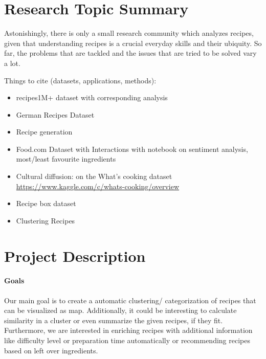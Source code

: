 \documentclass[
     12pt,         %
     a4paper,      %
     BCOR10mm,     %
     DIV14,        %
     ]{article}
\begin{document}

\section{Research Topic Summary}

Astonishingly, there is only a small research community which analyzes recipes, given that understanding recipes is a crucial everyday skills and their ubiquity. So far, the problems that are tackled and the issues that are tried to be solved vary a lot. 

Things to cite (datasets, applications, methods):
\begin{itemize}
  \item recipes1M+ dataset \cite{marin2019recipe1m} with corresponding analysis \cite{8099810}
  \item German Recipes Dataset \cite{germanrecipesdataset}
  \item Recipe generation \cite{majumder-etal-2019-generating}
  \item Food.com Dataset with Interactions \cite{foodcominteractions} with notebook on sentiment analysis, most/least favourite ingredients
  \item Cultural diffusion: \cite{cultdiffusion} on the What's cooking dataset \url{https://www.kaggle.com/c/whats-cooking/overview}
  \item Recipe box dataset \cite{recipebox}
  \item Clustering Recipes \cite{clusteringrecipes}
\end{itemize}


\section{Project Description}

\paragraph{Goals} Our main goal is to create a automatic clustering/ categorization  of recipes that can be visualized as map.  Additionally, it could be interesting to calculate similarity in a cluster or even summarize the given recipes, if they fit. Furthermore, we are interested in enriching recipes with 
additional information like difficulty level or preparation time automatically or recommending recipes based on left over ingredients.
\end{document}
